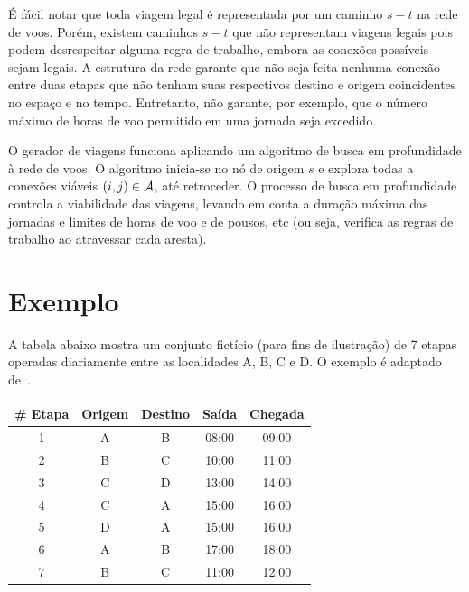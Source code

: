 É fácil notar que toda viagem legal é representada por um caminho $s-t$ na rede de voos. Porém,
existem caminhos $s-t$ que não representam viagens legais pois podem desrespeitar alguma regra de
trabalho, embora as conexões possíveis sejam legais. A estrutura da rede garante que não seja feita
nenhuma conexão entre duas etapas que não tenham suas respectivos destino e origem coincidentes no
espaço e no tempo. Entretanto, não garante, por exemplo, que o número máximo de horas de voo
permitido em uma jornada seja excedido. 

O gerador de viagens funciona aplicando um algoritmo de busca em profundidade à rede de voos. O
algoritmo inicia-se no nó de origem $s$ e explora todas a conexões viáveis $(i, j) \in \mathcal{A}$, até
retroceder. O processo de busca em profundidade controla a viabilidade das viagens, levando em conta
a duração máxima das jornadas e limites de horas de voo e de pousos, etc (ou seja, verifica as 
regras de trabalho ao atravessar cada aresta).


\section{Exemplo}
\label{sec:exemplo}

A tabela abaixo mostra um conjunto fictício (para fins de ilustração) de 7 etapas operadas 
diariamente entre as localidades A, B, C e D. O exemplo é adaptado de~\cite{barnhart03}. 

\begin{table}[ht]
	\begin{center}
		\begin{tabular}{ccccc}
			{\bf \# Etapa} & {\bf Origem} & {\bf Destino} & {\bf Saída} & {\bf Chegada} \\ \hline
			1 & A & B & 08:00 & 09:00 \\
			2 & B & C & 10:00 & 11:00 \\
			3 & C & D & 13:00 & 14:00 \\
			4 & C & A & 15:00 & 16:00 \\
			5 & D & A & 15:00 & 16:00 \\
			6 & A & B & 17:00 & 18:00 \\
			7 & B & C & 11:00 & 12:00 \\
		\end{tabular}
	\end{center}
\end{table}

